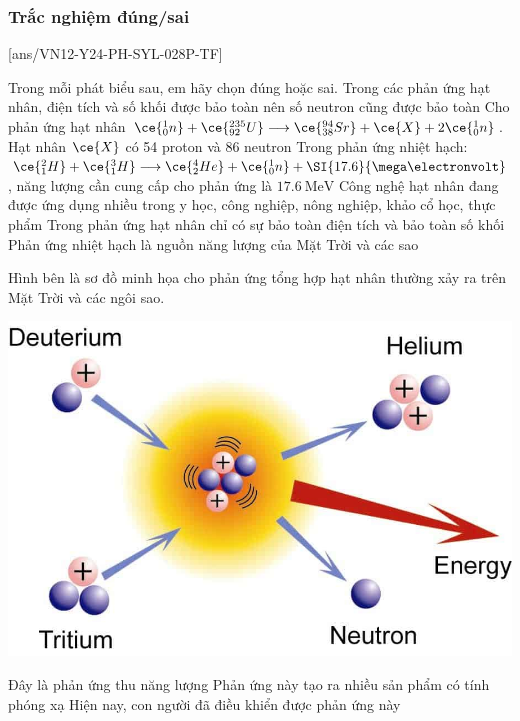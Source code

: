 \subsubsection{Trắc nghiệm đúng/sai}
[ans/VN12-Y24-PH-SYL-028P-TF]
\setcounter{ex}{0}
\begin{ex}
	Trong mỗi phát biểu sau, em hãy chọn đúng hoặc sai.	
	\choiceTFt
	{Trong các phản ứng hạt nhân, điện tích và số khối được bảo toàn nên số neutron cũng được bảo toàn}
	{\True Cho phản ứng hạt nhân $\ce{_0^1n}+\ce{_{92}^{235}U} \longrightarrow\ce{_{38}^{94}Sr}+\ce{X}+2\ce{_0^1n}$. Hạt nhân $\ce{X}$ có 54 proton và 86 neutron}
	{Trong phản ứng nhiệt hạch: $\ce{_1^2H}+\ce{_1^3H} \longrightarrow \ce{_2^4He}+\ce{_0^1n}+\SI{17.6}{\mega\electronvolt}$, năng lượng cần cung cấp cho phản ứng là $\SI{17.6}{\mega\electronvolt}$}
	{\True Công nghệ hạt nhân đang được ứng dụng nhiều trong y học, công nghiệp, nông nghiệp, khảo cổ học, thực phẩm}
	{Trong phản ứng hạt nhân chỉ có sự bảo toàn điện tích và bảo toàn số khối}
	{\True Phản ứng nhiệt hạch là nguồn năng lượng của Mặt Trời và các sao}
	\loigiai{}
\end{ex}
\begin{ex}
	Hình bên là sơ đồ minh họa cho phản ứng tổng hợp hạt nhân thường xảy ra trên Mặt Trời và các ngôi sao.
	\begin{center}
		\includegraphics[width=0.35\linewidth]{figs/VN12-Y24-PH-SYL-030P-1}
	\end{center}
	{Đây là phản ứng thu năng lượng}
	{Phản ứng này tạo ra nhiều sản phẩm có tính phóng xạ}
	{Hiện nay, con người đã điều khiển được phản ứng này}
\end{ex}
